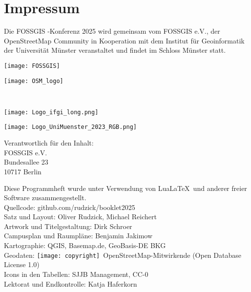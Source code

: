 \newpage
\vspace*{-4.5em}

\section*{Impressum}
\label{impressum}
\pagestyle{cropmarksstyle}

\RaggedRight
{\small
Die FOSSGIS -Konferenz 2025 wird gemeinsam vom FOSSGIS e.V.,  der OpenStreetMap Community
in Kooperation mit dem Institut für Geoinformatik der Universität Münster veranstaltet und
findet im Schloss Münster statt.

\vspace{0.5em}
\newlength\logoHeight
\setlength{\logoHeight}{4.0\baselineskip}
\begin{minipage}[c]{0.5\textwidth}
  \texttt{[image: FOSSGIS]}
\end{minipage}
\begin{minipage}[c]{0.45\textwidth}
  \texttt{[image: OSM\_logo]}
\end{minipage}\\
\begin{minipage}[l]{0.45\textwidth}
  \texttt{[image: Logo\_ifgi\_long.png]}
\end{minipage}
\begin{minipage}[r]{0.45\textwidth}
  \texttt{[image: Logo\_UniMuenster\_2023\_RGB.png]}
\end{minipage}

\vspace{1.0em}
\noindent Verantwortlich für den Inhalt:\\
FOSSGIS e.V.\\
Bundesallee 23\\
10717 Berlin

\vspace{0.5em}
\noindent Diese Programmheft wurde unter Verwendung von Lua\LaTeX\ und 
anderer freier Software zusammengestellt.\\
Quellcode: github.com/rudzick/booklet2025\\
\noindent Satz und Layout: Oliver Rudzick, Michael Reichert\\
Artwork und Titelgestaltung: Dirk Schroer\\
Campusplan und Raumpläne: Benjamin Jakimow\\
Kartographie: QGIS, Basemap.de, GeoBasis-DE BKG\\
Geodaten: \texttt{[image: copyright]}~Open\-Street\-Map-Mitwirkende (Open Database License 1.0)\\
Icons in den Tabellen: SJJB Management, CC-0\\
Lektorat und Endkontrolle: Katja Haferkorn

}
